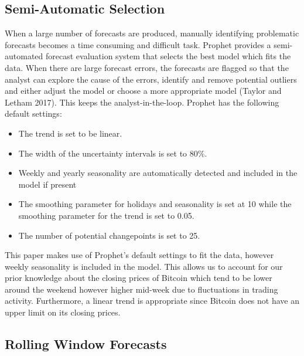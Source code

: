 \documentclass[12pt,a4paper]{article}
\numberwithin{equation}{section}
\numberwithin{figure}{section}
\numberwithin{table}{section}
\def\tightlist{}
\begin{document}
\subsection{\texorpdfstring{Semi-Automatic Selection
\label{Semi-Automatic Selection}}{Semi-Automatic Selection }}\label{semi-automatic-selection}

When a large number of forecasts are produced, manually identifying
problematic forecasts becomes a time consuming and difficult task.
Prophet provides a semi-automated forecast evaluation system that
selects the best model which fits the data. When there are large
forecast errors, the forecasts are flagged so that the analyst can
explore the cause of the errors, identify and remove potential outliers
and either adjust the model or choose a more appropriate model (Taylor
and Letham 2017). This keeps the analyst-in-the-loop. Prophet has the
following default settings:

\begin{itemize}
\tightlist
\item
  The trend is set to be linear.
\item
  The width of the uncertainty intervals is set to 80\%.
\item
  Weekly and yearly seasonality are automatically detected and included
  in the model if present
\item
  The smoothing parameter for holidays and seasonality is set at 10
  while the smoothing parameter for the trend is set to 0.05.
\item
  The number of potential changepoints is set to 25.
\end{itemize}

This paper makes use of Prophet's default settings to fit the data,
however weekly seasonality is included in the model. This allows us to
account for our prior knowledge about the closing prices of Bitcoin
which tend to be lower around the weekend however higher mid-week due to
fluctuations in trading activity. Furthermore, a linear trend is
appropriate since Bitcoin does not have an upper limit on its closing
prices.

\subsection{Rolling Window Forecasts}\label{rolling-window-forecasts}
\end{document}
